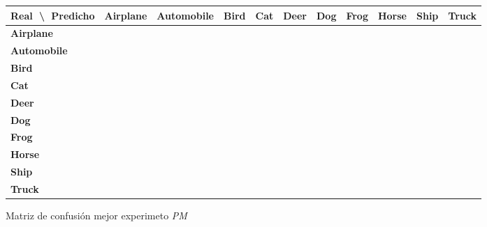 \documentclass{uc3mpracticas}
\begin{document}
\begin{figure}[!h]
\begin{center}
  \begin{tabular}{|g|c|c|c|c|c|c|c|c|c|c|}
    \hline
    Real $\;$\textbackslash  $\;$ Predicho  & \textbf{Airplane} & \textbf{Automobile} & \textbf{Bird} & \textbf{Cat} & \textbf{Deer} & \textbf{Dog} & \textbf{Frog} & \textbf{Horse} & \textbf{Ship} & \textbf{Truck} \\ \hline
            \textbf{Airplane}               &                 &                   &             &            &             &            &             &              &             &                \\ \hline
            \textbf{Automobile}             &                 &                   &             &            &             &            &             &              &             &                \\ \hline
            \textbf{Bird}                   &                 &                   &             &            &             &            &             &              &             &                \\ \hline
            \textbf{Cat}                    &                 &                   &             &            &             &            &             &              &             &                \\ \hline
            \textbf{Deer}                   &                 &                   &             &            &             &            &             &              &             &                \\ \hline
            \textbf{Dog}                    &                 &                   &             &            &             &            &             &              &             &                \\ \hline
            \textbf{Frog}                   &                 &                   &             &            &             &            &             &              &             &                \\ \hline
            \textbf{Horse}                  &                 &                   &             &            &             &            &             &              &             &                \\ \hline
            \textbf{Ship}                   &                 &                   &             &            &             &            &             &              &             &                \\ \hline
            \textbf{Truck}                  &                 &                   &             &            &             &            &             &              &             &                \\ \hline
      \end{tabular}
\end{center}
\caption*{Matriz de confusión mejor experimeto \textit{PM}}
\end{figure}
\end{document}

